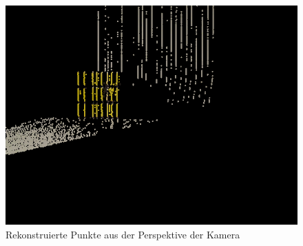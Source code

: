 \documentclass[xcolor=dvipsnames]{beamer}
\begin{document}
\begin{frame}
\begin{overlayarea}{\textwidth}{\textheight}
{\begin{figure}
				\includegraphics[width=0.8\linewidth]{includes/3d_y_cam.png}
				\caption{Rekonstruierte Punkte aus der Perspektive der Kamera}
				\label{fig:example3}
			\end{figure}
		}
	\end{overlayarea}

\end{frame}

\end{document}
